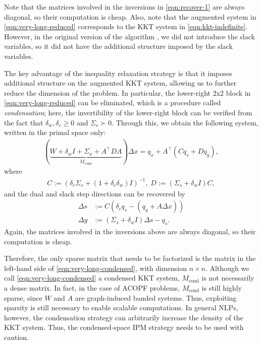 \documentclass{IEEEtran4PSCC} %
\begin{document}
Note that the matrices involved in the inversions in \eqref{eqn:recover-1}
are always diagonal, so their computation is cheap.
Also, note that the augmented system in \eqref{eqn:very-long-reduced}
corresponds to the KKT system in \eqref{eqn:kkt-indefinite}. However,
in the original version of the algorithm \cite{pacaud2023accelerating}, we did not introduce the
slack variables, so it did not have the additional structure imposed
by the slack variables.

The key advantage of the inequality relaxation strategy is that it
imposes additional structure on the augmented KKT system, allowing us to
further reduce the dimension of the problem. In particular, the
lower-right 2x2 block in \eqref{eqn:very-long-reduced} can be
eliminated, which is a procedure called {\it condensation}; here, the invertibility of the lower-right block can be verified from the fact that $\delta_w,\delta_c\geq 0$ and $\Sigma_s\succ 0$. Through this,
we obtain the following system, written in the  primal
space only:
\begin{align}\label{eqn:very-long-condensed}
  (\underbrace{W + \delta_wI + \Sigma_x + A^{\top} D A}_{M_\text{cond}} ) \Delta x = q_x + A^\top (C q_s +  Dq_y ),
\end{align}
where
\begin{align*}
  C := \left(\delta_c \Sigma_s + (1+\delta^{}_c\delta^{}_w) I\right)^{-1}, \;
  D := \left(\Sigma_s + \delta^{}_w I\right)C,
\end{align*}
and the dual and slack step directions can be recovered by
\begin{align}
  \Delta s &:= C \left(\delta_c q_s - (q_y + A\Delta x)\right)\nonumber\\
  \Delta y &:= (\Sigma_s + \delta_w I) \Delta s -q_s.\label{eqn:recover-2}
\end{align}
Again, the matrices involved in the inversions above are always
diagonal, so their computation is cheap.

Therefore, the only sparse matrix that needs to be factorized is the
matrix in the left-hand side of \eqref{eqn:very-long-condensed}, with
dimension $n \times n$.  Although we call
\eqref{eqn:very-long-condensed} a condensed KKT system, 
$M_\text{cond}$ is not necessarily a dense matrix. In fact, in the
case of ACOPF problems, $M_\text{cond}$ is still highly sparse, since
$W$ and $A$ are graph-induced banded systems.  Thus, exploiting
sparsity is still necessary to enable scalable computations.  In
general NLPs, however, the condensation strategy can arbitrarily
increase the density of the KKT system. Thus, the condensed-space IPM
strategy needs to be used with caution.
\end{document}
